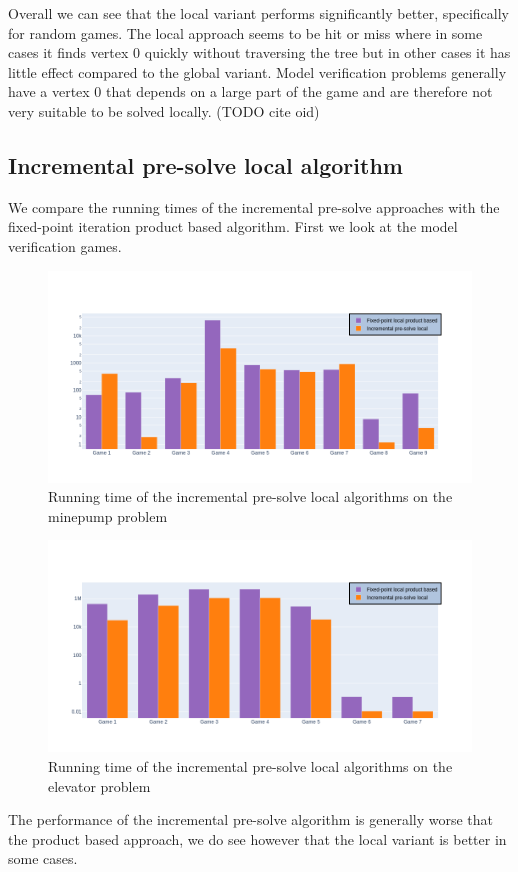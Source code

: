 Overall we can see that the local variant performs significantly better, specifically for random games. The local approach seems to be hit or miss where in some cases it finds vertex $0$ quickly without traversing the tree but in other cases it has little effect compared to the global variant. Model verification problems generally have a vertex $0$ that depends on a large part of the game and are therefore not very suitable to be solved locally. (TODO cite oid)

\subsection{Incremental pre-solve local algorithm}
We compare the running times of the incremental pre-solve approaches with the fixed-point iteration product based algorithm. First we look at the model verification games.
\begin{figure}[H]
	\includegraphics[width=1\linewidth]{"results/minepump/Fixed-point local product based_Incremental pre-solve local_"}
	\caption{Running time of the incremental pre-solve local algorithms on the minepump problem}
	\label{fig:minepumpzlnks}
\end{figure}%
\begin{figure}[H]
	\includegraphics[width=1\linewidth]{"results/elevator/Fixed-point local product based_Incremental pre-solve local_"}
	\caption{Running time of the incremental pre-solve local algorithms on the elevator problem}
	\label{fig:elevatorzlnks}
\end{figure}%
The performance of the incremental pre-solve algorithm is generally worse that the product based approach, we do see however that the local variant is better in some cases.

